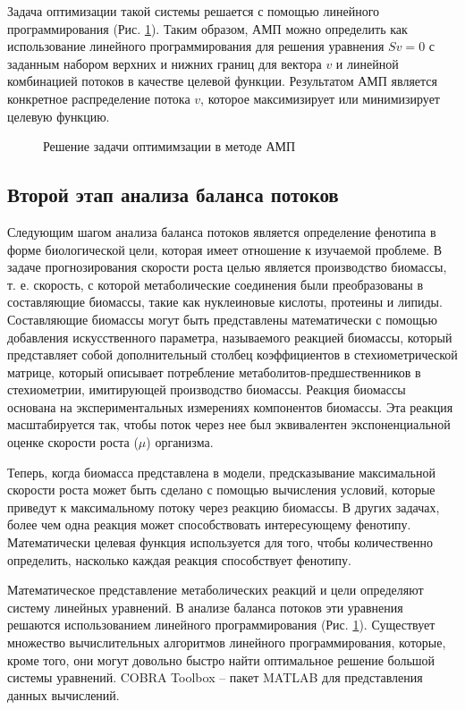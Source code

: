 \documentclass[a4paper, 12pt]{article}
\begin{document}
Задача оптимизации такой системы решается с помощью линейного программирования (Рис. \ref{fig:1_e}). Таким образом, АМП можно определить как использование линейного программирования для решения уравнения $Sv=0$ с заданным набором верхних и нижних границ для вектора $v$ и линейной комбинацией потоков в качестве целевой функции. Результатом АМП является конкретное распределение потока $v$, которое максимизирует или минимизирует целевую функцию.

\begin{figure}[h]
    \caption{Решение задачи оптимимзации в методе АМП}
    \label{fig:1_e}
\end{figure}

\subsection{Второй этап анализа баланса потоков}

Следующим шагом анализа баланса потоков является определение фенотипа в форме биологической цели, которая имеет отношение к изучаемой проблеме. В задаче прогнозирования скорости роста целью является производство биомассы, т. е. скорость, с которой метаболические соединения были преобразованы в составляющие биомассы, такие как нуклеиновые кислоты, протеины и липиды. Составляющие биомассы могут быть представлены математически с помощью добавления искусственного параметра, называемого реакцией биомассы, который представляет собой дополнительный столбец коэффициентов в стехиометрической матрице, который описывает потребление метаболитов-предшественников в стехиометрии, имитирующей производство биомассы. Реакция биомассы основана на экспериментальных измерениях компонентов биомассы. Эта реакция масштабируется так, чтобы поток через нее был эквивалентен экспоненциальной оценке скорости роста ($\mu$) организма.

Теперь, когда биомасса представлена в модели, предсказывание максимальной скорости роста может быть сделано с помощью вычисления условий, которые приведут к максимальному потоку через реакцию биомассы. В других задачах, более чем одна реакция может способствовать интересующему фенотипу. Математически целевая функция используется для того, чтобы количественно определить, насколько каждая реакция способствует фенотипу. 

Математическое представление метаболических реакций и цели определяют систему линейных уравнений. В анализе баланса потоков эти уравнения решаются использованием линейного программирования (Рис. \ref{fig:1_e}). Существует множество вычислительных алгоритмов линейного программирования, которые, кроме того, они могут довольно быстро найти оптимальное решение большой системы уравнений. COBRA Toolbox – пакет MATLAB для представления данных вычислений.
\end{document}

